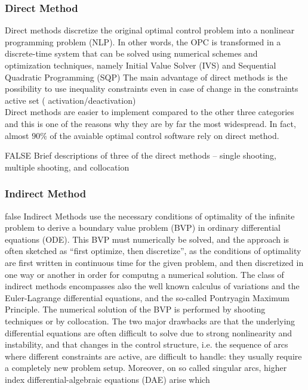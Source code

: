 \subsubsection{Direct Method}

Direct methods discretize the original optimal control problem into a  nonlinear programming problem (NLP). In other words, the OPC is transformed in a discrete-time system that can be solved using numerical schemes and  optimization techniques, namely Initial Value Solver (IVS) and Sequential Quadratic Programming (SQP) \cite{bertolazzi2005symbolic}
The main advantage of direct methods is the possibility to use inequality constraints even in case of change in the constraints active set ( activation/deactivation)\cite{biral2016notes}\\
Direct methods are easier to implement compared to the other three categories and this is one of the reasons why they are by far the most widespread. In fact, almost $90\%$ of the avaiable optimal control software rely on direct method. \cite{rao2009survey}\cite{rodrigues2014optimal}

\if FALSE
Brief descriptions
of three of the direct methods – single shooting, multiple shooting, and collocation
\fi

% 



\subsubsection{Indirect Method}

\if false 
Indirect Methods use the necessary conditions of optimality of the infinite
problem to derive a boundary value problem (BVP) in ordinary differential
equations (ODE). This BVP must numerically be solved, and the approach
is often sketched as “first optimize, then discretize”, as the conditions of optimality
are first written in continuous time for the given problem, and then
discretized in one way or another in order for computng a numerical solution.
The class of indirect methods encompasses also the well known calculus of variations
and the Euler-Lagrange differential equations, and the so-called Pontryagin
Maximum Principle. The numerical solution of the BVP is performed
by shooting techniques or by collocation. The two major drawbacks are that
the underlying differential equations are often difficult to solve due to strong
nonlinearity and instability, and that changes in the control structure, i.e. the
sequence of arcs where different constraints are active, are difficult to handle:
they usually require a completely new problem setup. Moreover, on so called
singular arcs, higher index differential-algebraic equations (DAE) arise which

